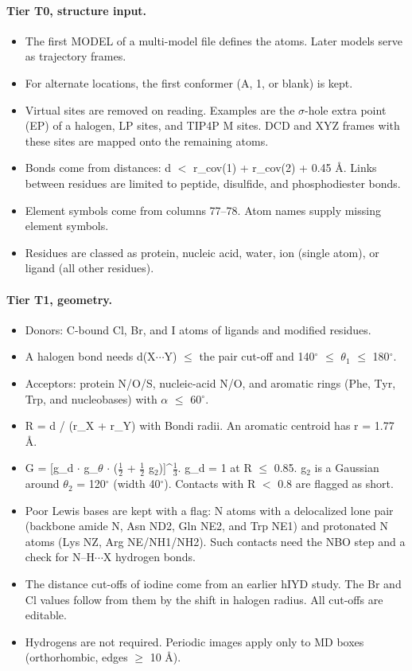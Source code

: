\paragraph{Tier T0, structure input.}
\begin{itemize}[nosep,leftmargin=*]
\item The first MODEL of a multi-model file defines the atoms. Later models serve as trajectory frames.
\item For alternate locations, the first conformer (A, 1, or blank) is kept.
\item Virtual sites are removed on reading. Examples are the $\sigma$-hole extra point (EP) of a halogen, LP sites, and TIP4P M sites. DCD and XYZ frames with these sites are mapped onto the remaining atoms.
\item Bonds come from distances: d $<$ r\_cov(1) + r\_cov(2) + 0.45 \AA{}. Links between residues are limited to peptide, disulfide, and phosphodiester bonds.
\item Element symbols come from columns 77--78. Atom names supply missing element symbols.
\item Residues are classed as protein, nucleic acid, water, ion (single atom), or ligand (all other residues).
\end{itemize}
\paragraph{Tier T1, geometry.}
\begin{itemize}[nosep,leftmargin=*]
\item Donors: C-bound Cl, Br, and I atoms of ligands and modified residues.
\item A halogen bond needs d(X$\cdots$Y) $\le$ the pair cut-off and 140$^\circ$ $\le$ $\theta_1$ $\le$ 180$^\circ$.
\item Acceptors: protein N/O/S, nucleic-acid N/O, and aromatic rings (Phe, Tyr, Trp, and nucleobases) with $\alpha$ $\le$ 60$^\circ$.
\item R = d / (r\_X + r\_Y) with Bondi radii. An aromatic centroid has r = 1.77 \AA{}.
\item G = [g\_d $\cdot$ g\_$\theta$ $\cdot$ ($\frac12$ + $\frac12$ g$_2$)]\^{}$\frac13$. g\_d = 1 at R $\le$ 0.85. g$_2$ is a Gaussian around $\theta_2$ = 120$^\circ$ (width 40$^\circ$). Contacts with R $<$ 0.8 are flagged as short.
\item Poor Lewis bases are kept with a flag: N atoms with a delocalized lone pair (backbone amide N, Asn ND2, Gln NE2, and Trp NE1) and protonated N atoms (Lys NZ, Arg NE/NH1/NH2). Such contacts need the NBO step and a check for N--H$\cdots$X hydrogen bonds.
\item The distance cut-offs of iodine come from an earlier hIYD study. The Br and Cl values follow from them by the shift in halogen radius. All cut-offs are editable.
\item Hydrogens are not required. Periodic images apply only to MD boxes (orthorhombic, edges $\ge$ 10 \AA{}).
\end{itemize}

